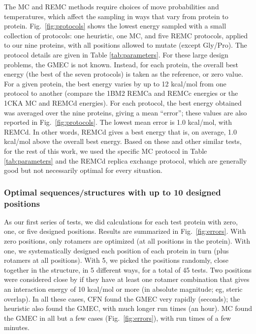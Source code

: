 \documentclass[a4paper,12pt]{article}
\begin{document}
The MC and REMC methods require choices of move probabilities and temperatures, which affect the sampling in ways
that vary from protein to protein. Fig.\ \ref{fig:protocols} shows the lowest energy sampled with a small
collection of protocols: one heuristic, one MC, and five REMC protocols, applied to our nine proteins, with all
positions allowed to mutate (except Gly/Pro). The protocol details are given in Table \ref{tab:parameters}. For
these large design problems, the GMEC is not known. Instead, for each protein, the overall best energy (the best
of the seven protocols) is taken as the reference, or zero value. For a given protein, the best energy varies by
up to 12 kcal/mol from one protocol to another (compare the 1BM2 REMCa and REMCc energies or the 1CKA MC and REMCd
energies). For each protocol, the best energy obtained was averaged over the nine proteins, giving a mean ``error'';
these values are also reported in Fig.\ \ref{fig:protocols}. The lowest mean error is 1.0 kcal/mol, with REMCd. In
other words, REMCd gives a best energy that is, on average, 1.0 kcal/mol above the overall best energy. Based on
these and other similar tests, for the rest of this work, we used the specific MC protocol in Table \ref{tab:parameters}
and the REMCd replica exchange protocol, which are generally good but not necessarily optimal for every situation. 

\subsubsection{Optimal sequences/structures with up to 10 designed positions}
As our first series of tests, we did calculations for each test protein with zero, one, or five designed positions.
Results are summarized in Fig.\ \ref{fig:errors}. With zero positions, only rotamers are optimized (at all positions
in the protein). With one, we systematically designed each position of each protein in turn (plus rotamers at all
positions). With 5, we picked the positions randomly, close together in the structure, in 5 different ways, for a
total of 45 tests. Two positions were considered close by if they have at least one rotamer combination that gives
an interaction energy of 10 kcal/mol or more (in absolute magnitude; eg, steric overlap). In all these cases, CFN
found the GMEC very rapidly (seconds); the heuristic also found the GMEC, with much longer run times (an hour). MC
found the GMEC in all but a  few cases (Fig.\ \ref{fig:errors}), with run times of a few minutes. 
\end{document}
